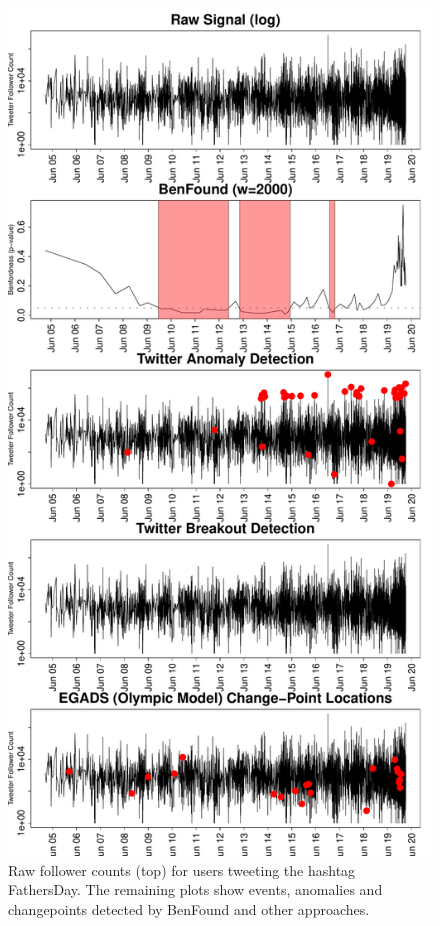 \documentclass[twoside,leqno,twocolumn]{article}\usepackage[]{graphicx}\usepackage[]{color}
\makeatletter
\def\maxwidth{ %
  \ifdim\Gin@nat@width>\linewidth
    \linewidth
  \else
    \Gin@nat@width
  \fi
}
\newenvironment{knitrout}{}{} %
\makeatother
\begin{document}
\begin{knitrout}
\color{fgcolor}\begin{figure}[t!]
\includegraphics[width=\maxwidth]{figure/case-study-hashtag-hijacking-twitter-1} \caption[Raw follower counts (top) for users tweeting the hashtag FathersDay]{Raw follower counts (top) for users tweeting the hashtag FathersDay. The remaining plots show events, anomalies and changepoints detected by BenFound and other approaches.}\label{fig:case-study-hashtag-hijacking-twitter}
\end{figure}


\end{knitrout}
\end{document}
